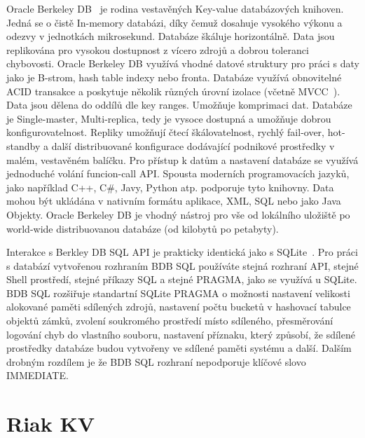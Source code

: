 \documentclass[czech,bachelor,dept460,male,csharp,cpdeclaration]{diploma}
\begin{document}
	Oracle Berkeley DB~\cite{berkeleydb} je rodina vestavěných Key-value databázových knihoven. Jedná se o čistě In-memory databázi, díky čemuž dosahuje vysokého výkonu a odezvy v jednotkách mikrosekund. Databáze škáluje horizontálně. Data jsou replikována pro vysokou dostupnost z vícero zdrojů a dobrou toleranci chybovosti. Oracle Berkeley DB využívá vhodné datové struktury pro práci s daty jako je B-strom, hash table indexy nebo fronta. Databáze využívá obnovitelné ACID transakce a poskytuje několik různých úrovní izolace (včetně MVCC~\cite{mvcc}). Data jsou dělena do oddílů dle key ranges. Umožňuje komprimaci dat. Databáze je Single-master, Multi-replica, tedy je vysoce dostupná a umožňuje dobrou konfigurovatelnost. Repliky umožňují čtecí škálovatelnost, rychlý fail-over, hot-standby a další distribuované konfigurace dodávající podnikové prostředky v malém, vestavěném balíčku. Pro přístup k datům a nastavení databáze se využívá jednoduché volání funcion-call API. Spousta moderních programovacích jazyků, jako například C++, C\#, Javy, Python atp. podporuje tyto knihovny. Data mohou být ukládána v nativním formátu aplikace, XML, SQL nebo jako Java Objekty. Oracle Berkeley DB je vhodný nástroj pro vše od lokálního uložiště po world-wide distribuovanou databáze (od kilobytů po petabyty).
	
	Interakce s Berkley DB SQL API je prakticky identická jako s SQLite~\cite{sqlite}. Pro práci s databází vytvořenou rozhraním BDB SQL používáte stejná rozhraní API, stejné Shell prostředí, stejné příkazy SQL a stejné PRAGMA, jako se využívá u SQLite. BDB SQL rozšiřuje standartní SQLite PRAGMA o možnosti nastavení velikosti alokované paměti sdílených zdrojů, nastavení počtu bucketů v hashovací tabulce objektů zámků, zvolení soukromého prostředí místo sdíleného, přesměrování logování chyb do vlastního souboru, nastavení příznaku, který způsobí, že sdílené prostředky databáze budou vytvořeny ve sdílené paměti systému a další. Dalším drobným rozdílem je že BDB SQL rozhraní nepodporuje klíčové slovo IMMEDIATE.
	
	\section{Riak KV}
	
\end{document}
